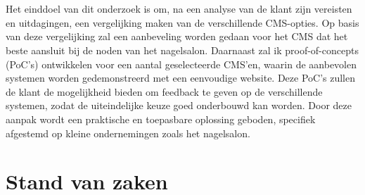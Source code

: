 \\ \\
Het einddoel van dit onderzoek is om, na een analyse van de klant zijn vereisten en uitdagingen, een vergelijking maken van de verschillende CMS-opties. Op basis van deze vergelijking zal een aanbeveling worden gedaan voor het CMS dat het beste aansluit bij de noden van het nagelsalon. Daarnaast zal ik proof-of-concepts (PoC's) ontwikkelen voor een aantal geselecteerde CMS'en, waarin de aanbevolen systemen worden gedemonstreerd met een eenvoudige website. Deze PoC's zullen de klant de mogelijkheid bieden om feedback te geven op de verschillende systemen, zodat de uiteindelijke keuze goed onderbouwd kan worden. Door deze aanpak wordt een praktische en toepasbare oplossing geboden, specifiek afgestemd op kleine ondernemingen zoals het nagelsalon.



\section{Stand van zaken}%
\label{sec:Stand van zaken}

